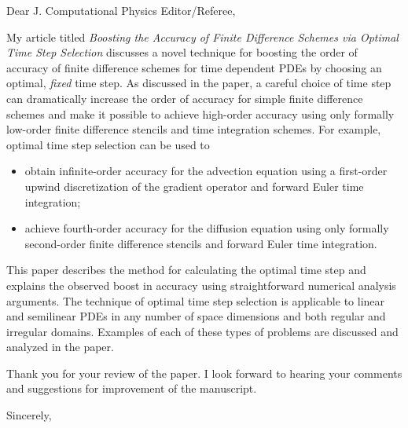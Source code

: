 \documentclass[12pt]{letter}
\begin{document}
\address{}
\signature{Kevin T. Chu}

\begin{letter}
{
}

\opening{Dear J. Computational Physics Editor/Referee,}

My article titled \emph{Boosting the Accuracy of Finite Difference Schemes 
via Optimal Time Step Selection} discusses a novel technique for boosting 
the order of accuracy of finite difference schemes for time dependent 
PDEs by choosing an optimal, \emph{fixed} time step.  As discussed in the 
paper, a careful choice of time step can dramatically increase the order of 
accuracy for simple finite difference schemes and make it possible to achieve 
high-order accuracy using only formally low-order finite difference stencils 
and time integration schemes.  For example, optimal time step selection can be 
used to 
\begin{itemize}
\item obtain infinite-order accuracy for the advection equation using 
      a first-order upwind discretization of the gradient operator and
      forward Euler time integration;
\item achieve fourth-order accuracy for the diffusion equation using only 
      formally second-order finite difference stencils and forward Euler 
      time integration. 
\end{itemize}
This paper describes the method for calculating the optimal time step and 
explains the observed boost in accuracy using straightforward numerical 
analysis arguments.  The technique of optimal time step selection is 
applicable to linear and semilinear PDEs in any number of space dimensions 
and both regular and irregular domains.  Examples of each of these types of 
problems are discussed and analyzed in the paper.

Thank you for your review of the paper.  I look forward to hearing your 
comments and suggestions for improvement of the manuscript.

\closing{Sincerely,}

\end{letter}
\end{document}

